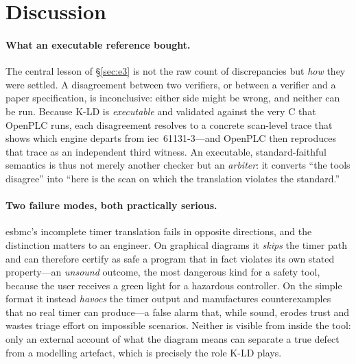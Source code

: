\providecommand{\kld}{\textsc{K-LD}}

\section{Discussion}
\label{sec:discussion}

\paragraph{What an executable reference bought.} The central lesson of
\S\ref{sec:e3} is not the raw count of discrepancies but \emph{how} they were
settled. A disagreement between two verifiers, or between a verifier and a paper
specification, is inconclusive: either side might be wrong, and neither can be run.
Because \kld{} is \emph{executable} and validated against the very C that OpenPLC
runs, each disagreement resolves to a concrete scan-level trace that shows which
engine departs from \gls{iec}~61131-3---and OpenPLC then reproduces that trace as
an independent third witness. An executable, standard-faithful semantics is thus
not merely another checker but an \emph{arbiter}: it converts ``the tools disagree''
into ``here is the scan on which the translation violates the standard.''

\paragraph{Two failure modes, both practically serious.} \gls{esbmc}'s incomplete
timer translation fails in opposite directions, and the distinction matters to an
engineer. On graphical diagrams it \emph{skips} the timer path and can therefore
certify as safe a program that in fact violates its own stated property---an
\emph{unsound} outcome, the most dangerous kind for a safety tool, because the user
receives a green light for a hazardous controller. On the simple format it instead
\emph{havocs} the timer output and manufactures counterexamples that no real timer
can produce---a false alarm that, while sound, erodes trust and wastes triage
effort on impossible scenarios. Neither is visible from inside the tool: only an
external account of what the diagram means can separate a true defect from a
modelling artefact, which is precisely the role \kld{} plays.

